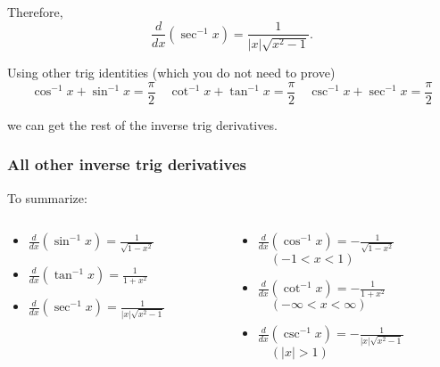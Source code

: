 \documentclass[14pt]{beamer}
\begin{document}
\begin{frame}
\frametitle{}
\small
Therefore,
\[\frac{d}{dx}(\sec^{-1} x)=\frac{1}{|x|\sqrt{x^2-1}}.\]

\vspace{1pc}
\hrulefill

\vspace{1pc}
\footnotesize
Using other trig identities (which you do not need to prove)
\[\cos^{-1}x+\sin^{-1}x=\dfrac{\pi}{2}\quad \cot^{-1}x+\tan^{-1}x=\dfrac{\pi}{2}\quad \csc^{-1}x+\sec^{-1}x=\dfrac{\pi}{2}\] 

we can get the rest of the inverse trig derivatives. 
\end{frame}

\begin{frame}
\frametitle{\small All other inverse trig derivatives}
To summarize:
\begin{columns}%
\begin{column}{0.45\textwidth}
\begin{itemize}
\footnotesize
\item[]$\frac{d}{dx}(\sin^{-1}x)=\frac{1}{\sqrt{1-x^2}}$ \vspace{1pc}
\item[]$\frac{d}{dx}(\tan^{-1}x)=\frac{1}{1+x^2}$ \vspace{1pc}
\item[]$\frac{d}{dx}(\sec^{-1}x)=\frac{1}{|x|\sqrt{x^2-1}}$ 
\end{itemize}
\end{column}

\begin{column}{0.6\textwidth}
\begin{itemize}
\footnotesize
\item[] $\frac{d}{dx}(\cos^{-1}x)=-\frac{1}{\sqrt{1-x^2}}$ \\[0.25pc] $\quad (-1<x<1)$ \vspace{1pc}
\item[] $\frac{d}{dx}(\cot^{-1}x)=-\frac{1}{1+x^2}$ \\[0.25pc] $\quad (-\infty<x<\infty) $ \vspace{1pc}
\item[] $\frac{d}{dx}(\csc^{-1}x)=-\frac{1}{|x|\sqrt{x^2-1}}$ \\[0.25pc] $\quad (|x|>1)$ 
\end{itemize}
\end{column}
\end{columns}
\end{frame}
\end{document}
